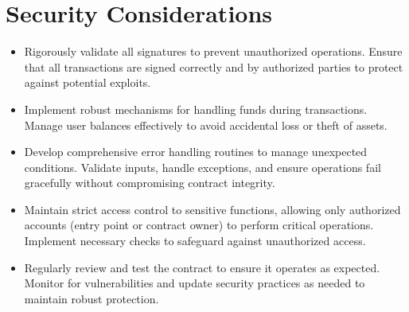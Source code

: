 \documentclass[a4paper,10pt,english]{sphinxmanual}
\begin{document}
\section{Security Considerations}
\label{\detokenize{docs_minimal_account_abstraction:security-considerations}}\begin{itemize}
\item {} 
\sphinxAtStartPar
{}
Rigorously validate all signatures to prevent unauthorized operations. Ensure that all transactions are signed correctly and by authorized parties to protect against potential exploits.

\item {} 
\sphinxAtStartPar
{}
Implement robust mechanisms for handling funds during transactions. Manage user balances effectively to avoid accidental loss or theft of assets.

\item {} 
\sphinxAtStartPar
{}
Develop comprehensive error handling routines to manage unexpected conditions. Validate inputs, handle exceptions, and ensure operations fail gracefully without compromising contract integrity.

\item {} 
\sphinxAtStartPar
{}
Maintain strict access control to sensitive functions, allowing only authorized accounts (entry point or contract owner) to perform critical operations. Implement necessary checks to safeguard against unauthorized access.

\item {} 
\sphinxAtStartPar
{}
Regularly review and test the contract to ensure it operates as expected. Monitor for vulnerabilities and update security practices as needed to maintain robust protection.

\end{itemize}



\renewcommand{\indexname}{Index}
\printindex
\end{document}
